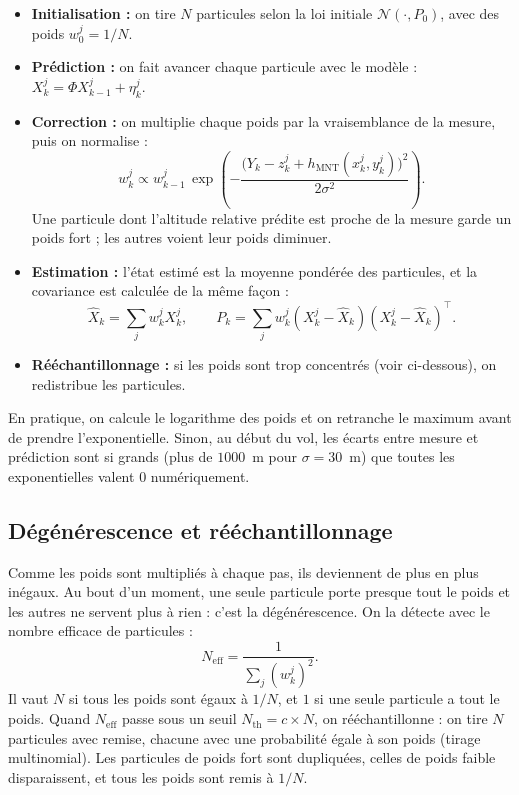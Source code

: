 \documentclass[11pt]{article}
\begin{document}
\begin{itemize}
\item \textbf{Initialisation :} on tire $N$ particules selon la loi initiale
$\mathcal{N}(\cdot, P_0)$, avec des poids $w_0^j = 1/N$.
\item \textbf{Prédiction :} on fait avancer chaque particule avec le modèle :
$X_k^j = \Phi X_{k-1}^j + \eta_k^j$.
\item \textbf{Correction :} on multiplie chaque poids par la vraisemblance de la
mesure, puis on normalise :
\begin{equation}
w_k^j \propto w_{k-1}^j \, \exp\!\left( -\frac{\big(Y_k - z_k^j + h_{\mathrm{MNT}}(x_k^j, y_k^j)\big)^2}{2\sigma^2} \right).
\end{equation}
Une particule dont l'altitude relative prédite est proche de la mesure garde un poids
fort ; les autres voient leur poids diminuer.
\item \textbf{Estimation :} l'état estimé est la moyenne pondérée des particules, et
la covariance est calculée de la même façon :
\begin{equation}
\hat X_k = \sum_j w_k^j X_k^j, \qquad
P_k = \sum_j w_k^j (X_k^j - \hat X_k)(X_k^j - \hat X_k)^\top .
\end{equation}
\item \textbf{Rééchantillonnage :} si les poids sont trop concentrés (voir ci-dessous),
on redistribue les particules.
\end{itemize}

En pratique, on calcule le logarithme des poids et on retranche le maximum avant de
prendre l'exponentielle. Sinon, au début du vol, les écarts entre mesure et prédiction
sont si grands (plus de $1000$~m pour $\sigma = 30$~m) que toutes les exponentielles
valent $0$ numériquement.

\subsection{Dégénérescence et rééchantillonnage}

Comme les poids sont multipliés à chaque pas, ils deviennent de plus en plus inégaux.
Au bout d'un moment, une seule particule porte presque tout le poids et les autres ne
servent plus à rien : c'est la dégénérescence. On la détecte avec le nombre efficace
de particules :
\begin{equation}
N_{\mathrm{eff}} = \frac{1}{\sum_j (w_k^j)^2}.
\end{equation}
Il vaut $N$ si tous les poids sont égaux à $1/N$, et $1$ si une seule particule a tout
le poids. Quand $N_{\mathrm{eff}}$ passe sous un seuil $N_{\mathrm{th}} = c \times N$, on
rééchantillonne : on tire $N$ particules avec remise, chacune avec une probabilité
égale à son poids (tirage multinomial). Les particules de poids fort sont dupliquées,
celles de poids faible disparaissent, et tous les poids sont remis à $1/N$.
\end{document}
